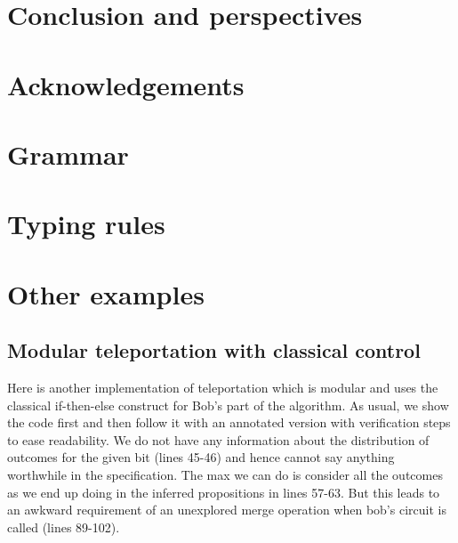 \documentclass[adraft,creativecommons]{eptcs}
\begin{document}
\section{Conclusion and perspectives}

\blindtext

\section*{Acknowledgements}
\blindtext




\appendix

\section{Grammar}


\section{Typing rules}


\section{Other examples}

\subsection{Modular teleportation with classical control}

Here is another implementation of teleportation which is modular and uses the classical if-then-else construct for Bob's part of the algorithm. As usual, we show the code first and then follow it with an annotated version with verification steps to ease readability. We do not have any information about the distribution of outcomes for the given bit (lines 45-46) and hence cannot say anything worthwhile in the specification. The max we can do is consider all the outcomes as we end up doing in the inferred propositions in lines 57-63. But this leads to an awkward requirement of an unexplored merge operation when bob's circuit is called (lines 89-102).


\end{document}
